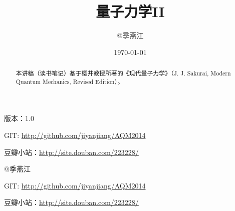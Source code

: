\documentclass[twoside,a5paper,11pt]{article}
\title{量子力学II}
\author{@季燕江}
\date{\today}                                           %
\begin{document}
\pagestyle{headings}

\maketitle


\begin{abstract}

本讲稿（读书笔记）基于樱井教授所著的《现代量子力学》（J. J. Sakurai, Modern Quantum Mechanics, Revised Edition）。

\end{abstract}


版本：1.0

GIT: \url{http://github.com/jiyanjiang/AQM2014}

豆瓣小站：\url{http://site.douban.com/223228/}


























\printindex

@季燕江

GIT: \url{http://github.com/jiyanjiang/AQM2014}

豆瓣小站：\url{http://site.douban.com/223228/}
\end{document}
